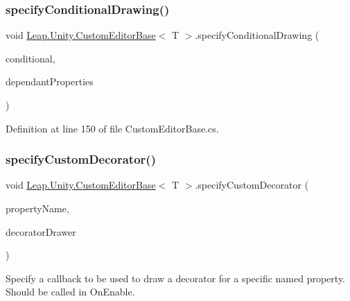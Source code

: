\subsubsection{\texorpdfstring{specifyConditionalDrawing()}{specifyConditionalDrawing()}\hspace{0.1cm}{\footnotesize\ttfamily [3/3]}}
{\footnotesize\ttfamily void \mbox{\hyperlink{class_leap_1_1_unity_1_1_custom_editor_base}{Leap.\+Unity.\+Custom\+Editor\+Base}}$<$ T $>$.specify\+Conditional\+Drawing (\begin{DoxyParamCaption}\item[{Func$<$ bool $>$}]{conditional,  }\item[{params string \mbox{[}$\,$\mbox{]}}]{dependant\+Properties }\end{DoxyParamCaption})\hspace{0.3cm}{\ttfamily [protected]}}



Definition at line 150 of file Custom\+Editor\+Base.\+cs.

\mbox{\label{class_leap_1_1_unity_1_1_custom_editor_base_ac4af66143c23aa0601e20d58bb3f532e}} 
\subsubsection{\texorpdfstring{specifyCustomDecorator()}{specifyCustomDecorator()}}
{\footnotesize\ttfamily void \mbox{\hyperlink{class_leap_1_1_unity_1_1_custom_editor_base}{Leap.\+Unity.\+Custom\+Editor\+Base}}$<$ T $>$.specify\+Custom\+Decorator (\begin{DoxyParamCaption}\item[{string}]{property\+Name,  }\item[{Action$<$ Serialized\+Property $>$}]{decorator\+Drawer }\end{DoxyParamCaption})\hspace{0.3cm}{\ttfamily [protected]}}



Specify a callback to be used to draw a decorator for a specific named property. Should be called in On\+Enable. 



